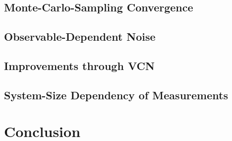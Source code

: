 \documentclass[
headings=optiontohead,              %
12pt,                               %
DIV=13,                             %
twoside=false,                      %
open=right,                         %
BCOR=00mm,                          %
toc=bibliographynumbered            %
]{scrreport}
\begin{document}
    \cite{starkManyBodyLocalization} %

    \section{Monte-Carlo-Sampling Convergence}

    \section{Observable-Dependent Noise}

    \section{Improvements through VCN}

    \section{System-Size Dependency of Measurements}

\chapter{Conclusion}
\label{sec:conclusion}

\FloatBarrier



\end{document}
